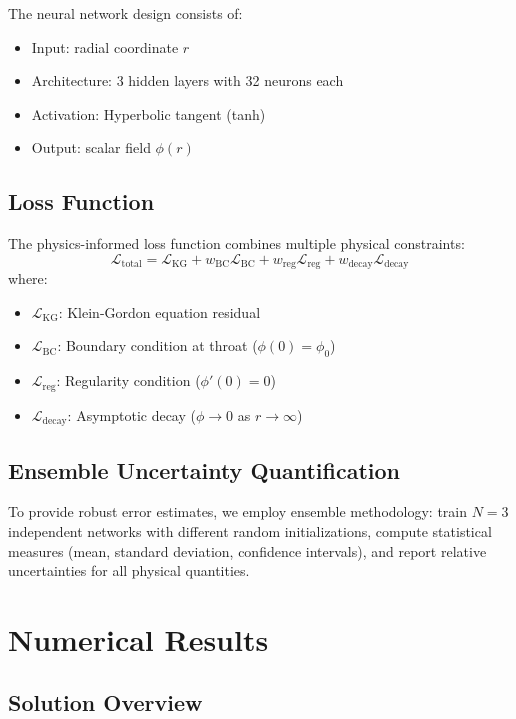 \documentclass[aps,prd,twocolumn,showpacs,superscriptaddress]{revtex4-1}
\begin{document}
The neural network design consists of:
\begin{itemize}
\item Input: radial coordinate $r$
\item Architecture: 3 hidden layers with 32 neurons each
\item Activation: Hyperbolic tangent (tanh)
\item Output: scalar field $\phi(r)$
\end{itemize}

\subsection{Loss Function}

The physics-informed loss function combines multiple physical constraints:
%
\begin{equation}
\mathcal{L}_{\text{total}} = \mathcal{L}_{\text{KG}} + w_{\text{BC}}\mathcal{L}_{\text{BC}} + w_{\text{reg}}\mathcal{L}_{\text{reg}} + w_{\text{decay}}\mathcal{L}_{\text{decay}}
\end{equation}
%
where:
\begin{itemize}
\item $\mathcal{L}_{\text{KG}}$: Klein-Gordon equation residual
\item $\mathcal{L}_{\text{BC}}$: Boundary condition at throat ($\phi(0) = \phi_0$)
\item $\mathcal{L}_{\text{reg}}$: Regularity condition ($\phi'(0) = 0$)
\item $\mathcal{L}_{\text{decay}}$: Asymptotic decay ($\phi \to 0$ as $r \to \infty$)
\end{itemize}

\subsection{Ensemble Uncertainty Quantification}

To provide robust error estimates, we employ ensemble methodology: train $N = 3$ independent networks with different random initializations, compute statistical measures (mean, standard deviation, confidence intervals), and report relative uncertainties for all physical quantities.

\section{Numerical Results}

\subsection{Solution Overview}
\end{document}
